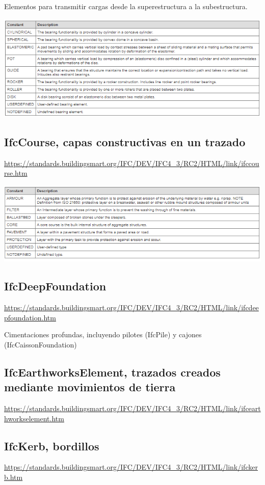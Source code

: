 \documentclass[spanish,12pt,a4paper,final,oneside]{book}
\begin{document}
Elementos para transmitir cargas desde la superestructura a la subestructura.

\includegraphics[width=\textwidth]{Definicion de IfcBearingTypeEnum}

\subsection{IfcCourse, capas constructivas en un trazado}
\url{https://standards.buildingsmart.org/IFC/DEV/IFC4_3/RC2/HTML/link/ifccourse.htm}

\includegraphics[width=\textwidth]{Definicion de IfcCourseTypeEnum}

\subsection{IfcDeepFoundation}
\url{https://standards.buildingsmart.org/IFC/DEV/IFC4_3/RC2/HTML/link/ifcdeepfoundation.htm}

Cimentaciones profundas, incluyendo pilotes (IfcPile) y cajones (IfcCaissonFoundation)

\subsection{IfcEarthworksElement, trazados creados mediante movimientos de tierra}
\url{https://standards.buildingsmart.org/IFC/DEV/IFC4_3/RC2/HTML/link/ifcearthworkselement.htm}

\subsection{IfcKerb, bordillos}
\url{https://standards.buildingsmart.org/IFC/DEV/IFC4_3/RC2/HTML/link/ifckerb.htm}
\end{document}
